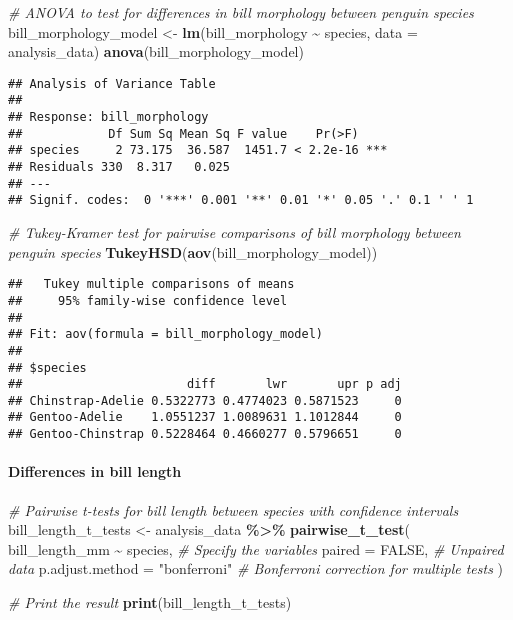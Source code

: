 \documentclass[
]{article}
\newenvironment{Shaded}{\begin{snugshade}}{\end{snugshade}}
\newcommand{\AttributeTok}[1]{\textcolor[rgb]{0.13,0.29,0.53}{#1}}
\newcommand{\CommentTok}[1]{\textcolor[rgb]{0.56,0.35,0.01}{\textit{#1}}}
\newcommand{\ConstantTok}[1]{\textcolor[rgb]{0.56,0.35,0.01}{#1}}
\newcommand{\FunctionTok}[1]{\textcolor[rgb]{0.13,0.29,0.53}{\textbf{#1}}}
\newcommand{\NormalTok}[1]{#1}
\newcommand{\OtherTok}[1]{\textcolor[rgb]{0.56,0.35,0.01}{#1}}
\newcommand{\SpecialCharTok}[1]{\textcolor[rgb]{0.81,0.36,0.00}{\textbf{#1}}}
\newcommand{\StringTok}[1]{\textcolor[rgb]{0.31,0.60,0.02}{#1}}
\begin{document}
\begin{Shaded}
\begin{Highlighting}[]
\CommentTok{\# ANOVA to test for differences in bill morphology between penguin species}
\NormalTok{bill\_morphology\_model }\OtherTok{\textless{}{-}} \FunctionTok{lm}\NormalTok{(bill\_morphology }\SpecialCharTok{\textasciitilde{}}\NormalTok{ species, }\AttributeTok{data =}\NormalTok{ analysis\_data)}
\FunctionTok{anova}\NormalTok{(bill\_morphology\_model)}
\end{Highlighting}
\end{Shaded}

\begin{verbatim}
## Analysis of Variance Table
## 
## Response: bill_morphology
##            Df Sum Sq Mean Sq F value    Pr(>F)    
## species     2 73.175  36.587  1451.7 < 2.2e-16 ***
## Residuals 330  8.317   0.025                      
## ---
## Signif. codes:  0 '***' 0.001 '**' 0.01 '*' 0.05 '.' 0.1 ' ' 1
\end{verbatim}

\begin{Shaded}
\begin{Highlighting}[]
\CommentTok{\# Tukey{-}Kramer test for pairwise comparisons of bill morphology between penguin species}
\FunctionTok{TukeyHSD}\NormalTok{(}\FunctionTok{aov}\NormalTok{(bill\_morphology\_model))}
\end{Highlighting}
\end{Shaded}

\begin{verbatim}
##   Tukey multiple comparisons of means
##     95% family-wise confidence level
## 
## Fit: aov(formula = bill_morphology_model)
## 
## $species
##                       diff       lwr       upr p adj
## Chinstrap-Adelie 0.5322773 0.4774023 0.5871523     0
## Gentoo-Adelie    1.0551237 1.0089631 1.1012844     0
## Gentoo-Chinstrap 0.5228464 0.4660277 0.5796651     0
\end{verbatim}

\paragraph{Differences in bill length}\label{differences-in-bill-length}

\begin{Shaded}
\begin{Highlighting}[]
\CommentTok{\# Pairwise t{-}tests for bill length between species with confidence intervals}
\NormalTok{bill\_length\_t\_tests }\OtherTok{\textless{}{-}}\NormalTok{ analysis\_data }\SpecialCharTok{\%\textgreater{}\%}
  \FunctionTok{pairwise\_t\_test}\NormalTok{(}
\NormalTok{    bill\_length\_mm }\SpecialCharTok{\textasciitilde{}}\NormalTok{ species,      }\CommentTok{\# Specify the variables}
    \AttributeTok{paired =} \ConstantTok{FALSE}\NormalTok{,                }\CommentTok{\# Unpaired data}
    \AttributeTok{p.adjust.method =} \StringTok{"bonferroni"} \CommentTok{\# Bonferroni correction for multiple tests}
\NormalTok{  )}

\CommentTok{\# Print the result}
\FunctionTok{print}\NormalTok{(bill\_length\_t\_tests)}
\end{Highlighting}
\end{Shaded}
\end{document}
